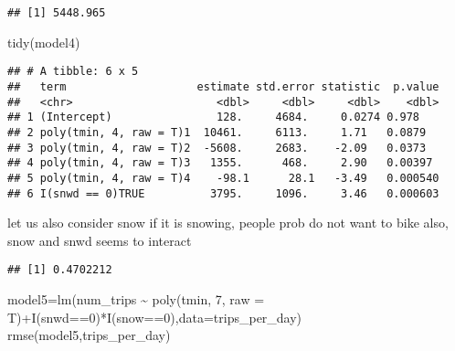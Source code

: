\documentclass[
]{article}
\newenvironment{Shaded}{\begin{snugshade}}{\end{snugshade}}
\newcommand{\AttributeTok}[1]{\textcolor[rgb]{0.77,0.63,0.00}{#1}}
\newcommand{\DecValTok}[1]{\textcolor[rgb]{0.00,0.00,0.81}{#1}}
\newcommand{\FunctionTok}[1]{\textcolor[rgb]{0.00,0.00,0.00}{#1}}
\newcommand{\NormalTok}[1]{#1}
\newcommand{\OtherTok}[1]{\textcolor[rgb]{0.56,0.35,0.01}{#1}}
\newcommand{\SpecialCharTok}[1]{\textcolor[rgb]{0.00,0.00,0.00}{#1}}
\begin{document}
\begin{verbatim}
## [1] 5448.965
\end{verbatim}

\begin{Shaded}
\begin{Highlighting}[]
\FunctionTok{tidy}\NormalTok{(model4)}
\end{Highlighting}
\end{Shaded}

\begin{verbatim}
## # A tibble: 6 x 5
##   term                    estimate std.error statistic  p.value
##   <chr>                      <dbl>     <dbl>     <dbl>    <dbl>
## 1 (Intercept)                128.     4684.     0.0274 0.978   
## 2 poly(tmin, 4, raw = T)1  10461.     6113.     1.71   0.0879  
## 3 poly(tmin, 4, raw = T)2  -5608.     2683.    -2.09   0.0373  
## 4 poly(tmin, 4, raw = T)3   1355.      468.     2.90   0.00397 
## 5 poly(tmin, 4, raw = T)4    -98.1      28.1   -3.49   0.000540
## 6 I(snwd == 0)TRUE          3795.     1096.     3.46   0.000603
\end{verbatim}

let us also consider snow if it is snowing, people prob do not want to
bike also, snow and snwd seems to interact

\begin{Shaded}
\end{Shaded}

\begin{verbatim}
## [1] 0.4702212
\end{verbatim}

\begin{Shaded}
\begin{Highlighting}[]
\NormalTok{model5}\OtherTok{=}\FunctionTok{lm}\NormalTok{(num\_trips }\SpecialCharTok{\textasciitilde{}} \FunctionTok{poly}\NormalTok{(tmin, }\DecValTok{7}\NormalTok{, }\AttributeTok{raw =}\NormalTok{ T)}\SpecialCharTok{+}\FunctionTok{I}\NormalTok{(snwd}\SpecialCharTok{==}\DecValTok{0}\NormalTok{)}\SpecialCharTok{*}\FunctionTok{I}\NormalTok{(snow}\SpecialCharTok{==}\DecValTok{0}\NormalTok{),}\AttributeTok{data=}\NormalTok{trips\_per\_day)}
\FunctionTok{rmse}\NormalTok{(model5,trips\_per\_day)}
\end{Highlighting}
\end{Shaded}
\end{document}
